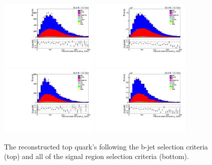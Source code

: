 \begin{figure}[ht]
\centering
\includegraphics[width=0.42\textwidth]{figs/background-estimation/plots/unblinded/prompt_ee_ttbarInc/topPt_NPL_ee_bTag_ee.pdf}
\includegraphics[width=0.42\textwidth]{figs/background-estimation/plots/unblinded/prompt_mumu_ttbarInc/topPt_NPL_mumu_bTag_mumu.pdf}
\\
\includegraphics[width=0.42\textwidth]{figs/background-estimation/plots/unblinded/prompt_ee_ttbarInc/topPt_NPL_ee_wMass_ee.pdf}
\includegraphics[width=0.42\textwidth]{figs/background-estimation/plots/unblinded/prompt_mumu_ttbarInc/topPt_NPL_mumu_wMass_mumu.pdf}
\caption{
The reconstructed top quark's \pT following the b-jet selection criteria (top) and all of the signal region selection criteria (bottom).
}
\label{fig:SR_topPt}
\end{figure}

